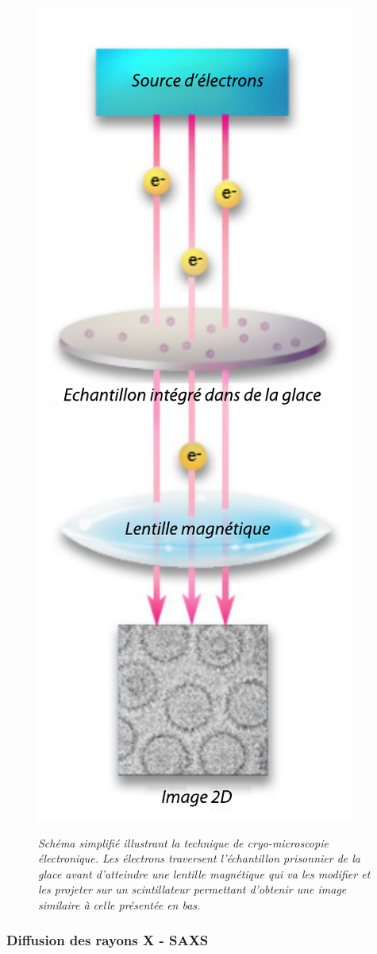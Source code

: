 \begin{figure}
  \centering
  {\includegraphics[width=0.4\linewidth]{./figures/ch1/cryoem.pdf}}
    \caption{\it Schéma simplifié illustrant la technique de cryo-microscopie électronique. Les électrons traversent l'échantillon prisonnier de la glace avant d'atteindre une lentille magnétique qui va les modifier et les projeter sur un scintillateur permettant d'obtenir une image similaire à celle présentée en bas.}
    \label{Fig:cryoem}
  \hspace{0.2cm}
\end{figure}

\subsubsection{Diffusion des rayons X - SAXS}

